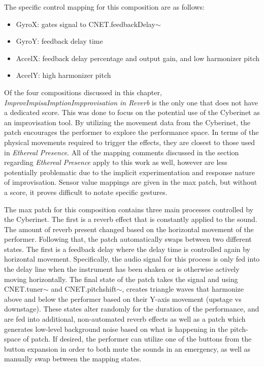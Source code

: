 The specific control mapping for this composition are as follows: 

\begin{itemize}
    \item GyroX: gates signal to CNET.feedbackDelay$\sim$
    \item GyroY: feedback delay time
    \item AccelX: feedback delay percentage and output gain, and low harmonizer pitch
    \item AccelY: high harmonizer pitch
\end{itemize}

Of the four compositions discussed in this chapter, \textit{ImprovImpisaImptionImpprovisation in Reverb} is the only one that does not have a dedicated score. This was done to focus on the potential use of the Cyberinet as an improvisation tool. By utilizing the movement data from the Cyberinet, the patch encourages the performer to explore the performance space. In terms of the physical movements required to trigger the effects, they are closest to those used in \textit{Ethereal Presence}. All of the mapping comments discussed in the section regarding \textit{Ethereal Presence} apply to this work as well, however are less potentially problematic due to the implicit experimentation and response nature of improvisation. Sensor value mappings are given in the max patch, but without a score, it proves difficult to notate specific gestures.

The max patch for this composition contains three main processes controlled by the Cyberinet. The first is a reverb effect that is constantly applied to the sound. The amount of reverb present changed based on the horizontal movement of the performer. Following that, the patch automatically swaps between two different states. The first is a feedback delay where the delay time is controlled again by horizontal movement. Specifically, the audio signal for this process is only fed into the delay line when the instrument has been shaken or is otherwise actively moving horizontally. The final state of the patch takes the signal and using CNET.tuner$\sim$ and CNET.pitchshift$\sim$, creates triangle waves that harmonize above and below the performer based on their Y-axis movement (upstage vs downstage). These states alter randomly for the duration of the performance, and are fed into additional, non-automated reverb effects as well as a patch which generates low-level background noise based on what is happening in the pitch-space of patch. If desired, the performer can utilize one of the buttons from the button expansion in order to both mute the sounds in an emergency, as well as manually swap between the mapping states.

